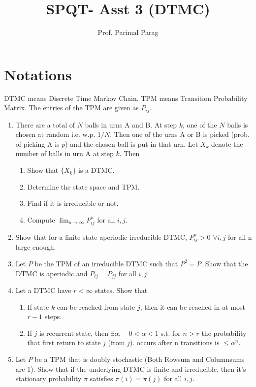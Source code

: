 \documentclass[a4paper,10pt]{article}
\title{SPQT- Asst 3 (DTMC)}
\author{Prof. Parimal Parag}
\begin{document}
\maketitle
\section{Notations}
DTMC means Discrete Time Markov Chain. TPM means Transition Probability Matrix. The entries of the TPM are given as $P_{ij}$. 
\begin{enumerate}
	\item There are a total of $N$ balls in urns A and B. At step $k$, one of the $N$ balls is chosen at random i.e. w.p. $1/N$. Then one of the urns A or B is picked (prob. of picking A is $p$) and the chosen ball is put in that urn. Let $X_k$ denote the number of balls in urn A at step $k$. Then
	\begin{enumerate}
		\item Show that $\{X_k\}$ is a DTMC.
		\item Determine the state space and TPM.
		\item Find if it is irreducible or not.
		\item Compute $\lim_{n\to \infty} P_{ij}^n$ for all $i,j$.
	\end{enumerate}
	
	\item Show that for a finite state aperiodic irreducible DTMC, $P^n_{ij} > 0$ $\forall i,j$ for all n large enough.
	
	\item Let $P$ be the TPM of an irreducible DTMC such that $P^2=P$. Show that the DTMC is aperiodic and $P_{ij} = P_{jj}$ for all $i,j$.
	
	\item Let a DTMC have $r < \infty$ states. Show that
	\begin{enumerate}
		\item If state $k$ can be reached from state  $j$, then it can be reached in at most $r-1$ steps.
		\item If $j$ is recurrent state, then $\exists \alpha, \quad 0 < \alpha < 1$ s.t. for $n>r$ the probability that first return to state $j$ (from $j$). occurs after n transitions is $\leq \alpha^n$.
	\end{enumerate}
	
	\item Let $P$ be a TPM that is doubly stochastic (Both Rowsum and Columnsums are 1). Show that if the underlying DTMC is finite and irreducible, then it's stationary probability $\pi$ satisfies $\pi(i) = \pi(j)$ for all $i,j$.
		

\end{enumerate}
\end{document}
